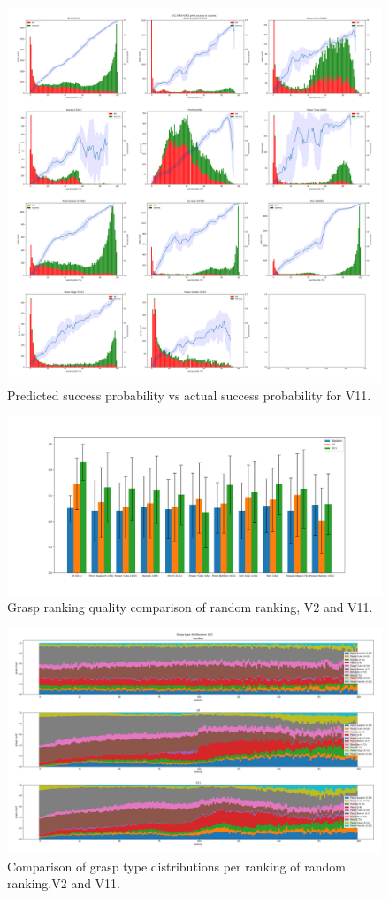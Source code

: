 \begin{figure}
\centering
\includegraphics[width=0.8\columnwidth]{images/post-analysis/[4] V11_pred_success_vs_success.png}
\caption{Predicted success probability vs actual success probability for V11.}
\label{fig:post4}
\end{figure}

\begin{figure}
\centering
\includegraphics[width=0.8\columnwidth]{images/post-analysis/[5] Ranking_quality_mean_AUC.png}
\caption{Grasp ranking quality comparison of random ranking, V2 and V11.}
\label{fig:post5}
\end{figure}

\begin{figure}
\centering
\includegraphics[width=0.8\columnwidth]{images/post-analysis/[6] Grasp_type_distributions_all.png}
\caption{Comparison of grasp type distributions per ranking of random ranking,V2 and V11.}
\label{fig:post6}
\end{figure}

